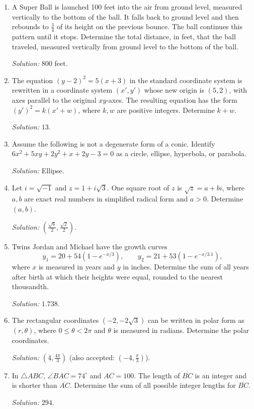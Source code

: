 \documentclass[11pt]{article}
\begin{document}
\begin{enumerate}[label=\textbf{\arabic*.}]
\item A Super Ball is launched 100 feet into the air from ground level, measured vertically to the bottom of the ball. It falls back to ground level and then rebounds to $\frac34$ of its height on the previous bounce. The ball continues this pattern until it stops. Determine the total distance, in feet, that the ball traveled, measured vertically from ground level to the bottom of the ball.\par\textit{Solution: }$800$ feet.

\item The equation $(y-2)^2=5(x+3)$ in the standard coordinate system is rewritten in a coordinate system $(x',y')$ whose new origin is $(5,2)$, with axes parallel to the original $xy$-axes. The resulting equation has the form $(y')^2=k(x'+w)$, where $k,w$ are positive integers. Determine $k+w$.\par\textit{Solution: }$13$.

\item Assume the following is not a degenerate form of a conic. Identify $6x^2+5xy+2y^2+x+2y-3=0$ as a circle, ellipse, hyperbola, or parabola.\par\textit{Solution: }Ellipse.

\item Let $i=\sqrt{-1}$ and $z=1+i\sqrt3$. One square root of $z$ is $\sqrt z=a+bi$, where $a,b$ are exact real numbers in simplified radical form and $a>0$. Determine $(a,b)$.\par\textit{Solution: }$\left(\frac{\sqrt6}{2},\frac{\sqrt2}{2}\right)$.

\item Twins Jordan and Michael have the growth curves
\[
y_1=20+54\left(1-e^{-x/3}\right),\qquad y_2=21+53\left(1-e^{-x/3.1}\right),
\]
where $x$ is measured in years and $y$ in inches. Determine the sum of all years after birth at which their heights were equal, rounded to the nearest thousandth.\par\textit{Solution: }$1.738$.

\item The rectangular coordinates $(-2,-2\sqrt3)$ can be written in polar form as $(r,\theta)$, where $0\leq\theta<2\pi$ and $\theta$ is measured in radians. Determine the polar coordinates.\par\textit{Solution: }$\left(4,\frac{4\pi}{3}\right)$ (also accepted: $\left(-4,\frac{\pi}{3}\right)$).

\item In $\triangle ABC$, $\angle BAC=74^\circ$ and $AC=100$. The length of $\overline{BC}$ is an integer and is shorter than $\overline{AC}$. Determine the sum of all possible integer lengths for $\overline{BC}$.\par\textit{Solution: }$294$.


\end{enumerate}
\end{document}

